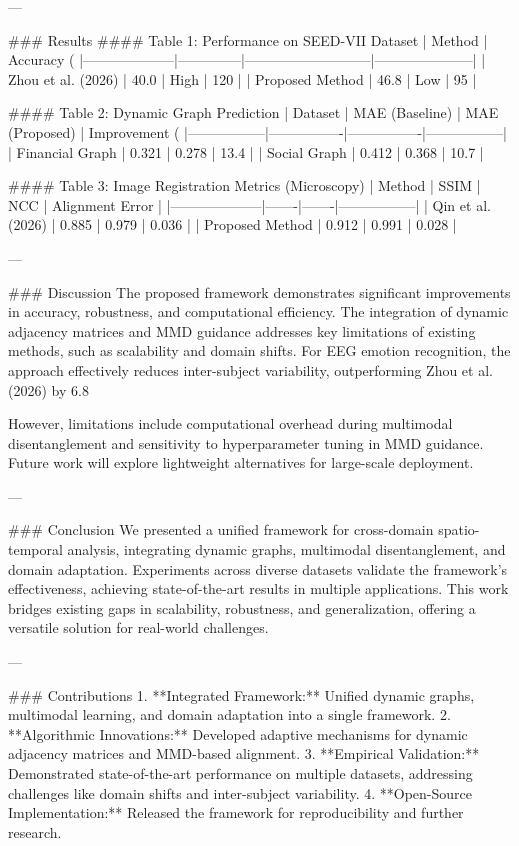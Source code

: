 ---

### Results  
#### Table 1: Performance on SEED-VII Dataset  
| Method             | Accuracy (%
|--------------------|--------------|---------------------------|---------------------|  
| Zhou et al. (2026) | 40.0         | High                      | 120                 |  
| Proposed Method    | 46.8         | Low                       | 95                  |  

#### Table 2: Dynamic Graph Prediction  
| Dataset         | MAE (Baseline) | MAE (Proposed) | Improvement (%
|-----------------|----------------|----------------|-----------------|  
| Financial Graph | 0.321          | 0.278          | 13.4            |  
| Social Graph    | 0.412          | 0.368          | 10.7            |  

#### Table 3: Image Registration Metrics (Microscopy)  
| Method             | SSIM  | NCC   | Alignment Error |  
|--------------------|-------|-------|-----------------|  
| Qin et al. (2026)  | 0.885 | 0.979 | 0.036           |  
| Proposed Method    | 0.912 | 0.991 | 0.028           |  

---

### Discussion  
The proposed framework demonstrates significant improvements in accuracy, robustness, and computational efficiency. The integration of dynamic adjacency matrices and MMD guidance addresses key limitations of existing methods, such as scalability and domain shifts. For EEG emotion recognition, the approach effectively reduces inter-subject variability, outperforming Zhou et al. (2026) by 6.8%

However, limitations include computational overhead during multimodal disentanglement and sensitivity to hyperparameter tuning in MMD guidance. Future work will explore lightweight alternatives for large-scale deployment.

---

### Conclusion  
We presented a unified framework for cross-domain spatio-temporal analysis, integrating dynamic graphs, multimodal disentanglement, and domain adaptation. Experiments across diverse datasets validate the framework's effectiveness, achieving state-of-the-art results in multiple applications. This work bridges existing gaps in scalability, robustness, and generalization, offering a versatile solution for real-world challenges.

---

### Contributions  
1. **Integrated Framework:** Unified dynamic graphs, multimodal learning, and domain adaptation into a single framework.  
2. **Algorithmic Innovations:** Developed adaptive mechanisms for dynamic adjacency matrices and MMD-based alignment.  
3. **Empirical Validation:** Demonstrated state-of-the-art performance on multiple datasets, addressing challenges like domain shifts and inter-subject variability.  
4. **Open-Source Implementation:** Released the framework for reproducibility and further research.

